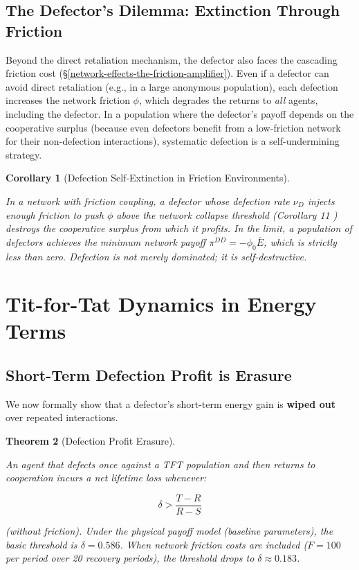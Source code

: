 \documentclass[11pt]{article}
\theoremstyle{plain}
\newtheorem{theorem}{Theorem}
\newtheorem{corollary}[theorem]{Corollary}
\theoremstyle{definition}
\theoremstyle{remark}
\let\origsection\section
\renewcommand{\section}{\needspace{12\baselineskip}\origsection}
\let\origsubsection\subsection
\renewcommand{\subsection}{\needspace{7\baselineskip}\origsubsection}
\begin{document}
\subsection{The Defector's Dilemma: Extinction Through
Friction}\label{the-defectors-dilemma-extinction-through-friction}

Beyond the direct retaliation mechanism, the defector also faces the
cascading friction cost (§\ref{network-effects-the-friction-amplifier}).
Even if a defector can avoid direct retaliation (e.g., in a large
anonymous population), each defection increases the network friction
\(\phi\), which degrades the returns to \emph{all} agents, including the
defector. In a population where the defector's payoff depends on the
cooperative surplus (because even defectors benefit from a low-friction
network for their non-defection interactions), systematic defection is a
self-undermining strategy.

\begin{corollary}[Defection Self-Extinction in Friction Environments]
\label{cor-defection-self-extinction}

In a network with friction coupling, a defector whose defection rate $\nu_D$ injects enough friction to push $\phi$ above the network collapse threshold (Corollary 11 \citep{TC-IV}) destroys the cooperative surplus from which it profits. In the limit, a population of defectors achieves the minimum network payoff $\pi^{DD} = -\phi_0 \bar{E}$, which is strictly less than zero. Defection is not merely dominated; it is self-destructive.
\end{corollary}

\section{Tit-for-Tat Dynamics in Energy
Terms}\label{tit-for-tat-dynamics-in-energy-terms}

\subsection{Short-Term Defection Profit is
Erasure}\label{short-term-defection-profit-is-erasure}

We now formally show that a defector's short-term energy gain is
\textbf{wiped out} over repeated interactions.

\begin{theorem}[Defection Profit Erasure]
\label{thm-defection-profit-erasure}

An agent that defects once against a TFT population and then returns to cooperation incurs a net lifetime loss whenever:

$$\delta > \frac{T - R}{R - S}$$

(without friction). Under the physical payoff model (baseline parameters), the basic threshold is $\delta = 0.586$. When network friction costs are included ($F = 100$ per period over 20 recovery periods), the threshold drops to $\delta \approx 0.183$.
\end{theorem}
\end{document}
